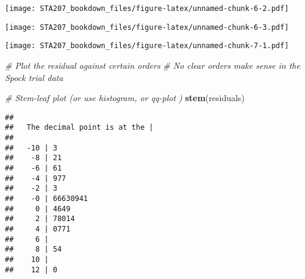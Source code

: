 \documentclass[12pt,]{book}
\newenvironment{Shaded}{\begin{snugshade}}{\end{snugshade}}
\newcommand{\KeywordTok}[1]{\textcolor[rgb]{0.13,0.29,0.53}{\textbf{#1}}}
\newcommand{\DataTypeTok}[1]{\textcolor[rgb]{0.13,0.29,0.53}{#1}}
\newcommand{\DecValTok}[1]{\textcolor[rgb]{0.00,0.00,0.81}{#1}}
\newcommand{\FloatTok}[1]{\textcolor[rgb]{0.00,0.00,0.81}{#1}}
\newcommand{\StringTok}[1]{\textcolor[rgb]{0.31,0.60,0.02}{#1}}
\newcommand{\CommentTok}[1]{\textcolor[rgb]{0.56,0.35,0.01}{\textit{#1}}}
\newcommand{\OperatorTok}[1]{\textcolor[rgb]{0.81,0.36,0.00}{\textbf{#1}}}
\newcommand{\NormalTok}[1]{#1}
\begin{document}
\texttt{[image: STA207\_bookdown\_files/figure-latex/unnamed-chunk-6-2.pdf]}

\begin{Shaded}
\end{Shaded}

\texttt{[image: STA207\_bookdown\_files/figure-latex/unnamed-chunk-6-3.pdf]}

\begin{Shaded}
\end{Shaded}

\texttt{[image: STA207\_bookdown\_files/figure-latex/unnamed-chunk-7-1.pdf]}

\begin{Shaded}
\begin{Highlighting}[]
\CommentTok{# Plot the residual against certain orders}
\CommentTok{# No clear orders make sense in the Spock trial data }

\CommentTok{# Stem-leaf plot  (or use histogram, or qq-plot )}
\KeywordTok{stem}\NormalTok{(residuals)}
\end{Highlighting}
\end{Shaded}

\begin{verbatim}
## 
##   The decimal point is at the |
## 
##   -10 | 3
##    -8 | 21
##    -6 | 61
##    -4 | 977
##    -2 | 3
##    -0 | 66630941
##     0 | 4649
##     2 | 78014
##     4 | 0771
##     6 | 
##     8 | 54
##    10 | 
##    12 | 0
\end{verbatim}
\end{document}
